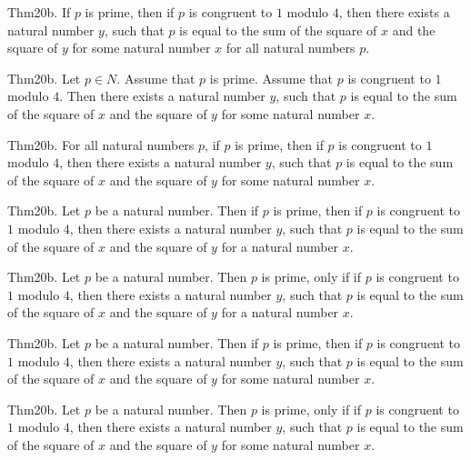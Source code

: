 \documentclass{article}
\begin{document}
Thm20b. If $p$ is prime, then if $p$ is congruent to $1$ modulo $4$, then there exists a natural number $y$, such that $p$ is equal to the sum of the square of $x$ and the square of $y$ for some natural number $x$ for all natural numbers $p$.

Thm20b. Let $p \in N$. Assume that $p$ is prime. Assume that $p$ is congruent to $1$ modulo $4$. Then there exists a natural number $y$, such that $p$ is equal to the sum of the square of $x$ and the square of $y$ for some natural number $x$.

Thm20b. For all natural numbers $p$, if $p$ is prime, then if $p$ is congruent to $1$ modulo $4$, then there exists a natural number $y$, such that $p$ is equal to the sum of the square of $x$ and the square of $y$ for some natural number $x$.

Thm20b. Let $p$ be a natural number. Then if $p$ is prime, then if $p$ is congruent to $1$ modulo $4$, then there exists a natural number $y$, such that $p$ is equal to the sum of the square of $x$ and the square of $y$ for a natural number $x$.

Thm20b. Let $p$ be a natural number. Then $p$ is prime, only if if $p$ is congruent to $1$ modulo $4$, then there exists a natural number $y$, such that $p$ is equal to the sum of the square of $x$ and the square of $y$ for a natural number $x$.

Thm20b. Let $p$ be a natural number. Then if $p$ is prime, then if $p$ is congruent to $1$ modulo $4$, then there exists a natural number $y$, such that $p$ is equal to the sum of the square of $x$ and the square of $y$ for some natural number $x$.

Thm20b. Let $p$ be a natural number. Then $p$ is prime, only if if $p$ is congruent to $1$ modulo $4$, then there exists a natural number $y$, such that $p$ is equal to the sum of the square of $x$ and the square of $y$ for some natural number $x$.
\end{document}
